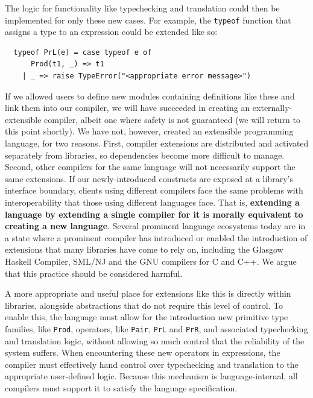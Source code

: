 \documentclass{llncs}
\begin{document}
The logic for functionality like typechecking and translation could then be implemented for only these new cases. For example, the \lstinline{typeof} function that assigns a type to an expression could be extended like so:
\begin{lstlisting}
  typeof PrL(e) = case typeof e of 
      Prod(t1, _) => t1 
    | _ => raise TypeError("<appropriate error message>")
\end{lstlisting}

If we allowed users to define new modules containing definitions like these and link them into our compiler, we will have succeeded in creating an externally-extensible compiler, albeit one where safety is not guaranteed (we will return to this point shortly). We have not, however, created an extensible programming language, for two reasons. First, compiler extensions are distributed and activated separately from libraries, so dependencies become more difficult to manage. Second, other compilers for the same language will not necessarily support the same extensions. 
If our newly-introduced constructs are exposed at a library's  interface boundary, clients using different compilers face the same problems with interoperability that those using different languages face. That is, \textbf{extending a language by extending a single compiler for it is morally equivalent to creating a new language}. Several prominent language ecosystems today are in a state where a prominent compiler has introduced or enabled the introduction of extensions that many libraries have come to rely on, including the Glasgow Haskell Compiler, SML/NJ and the GNU compilers for C and C++. We argue that this practice should be considered harmful.

A more appropriate and useful place for extensions like this is directly within libraries, alongside abstractions that do not require this level of control. To enable this, the language must allow for the introduction new primitive type families, like \lstinline{Prod}, operators, like \lstinline{Pair}, \lstinline{PrL} and \lstinline{PrR}, and associated typechecking and translation logic, without allowing so much control that the reliability of the system suffers. When encountering these new operators in expressions, the compiler must effectively  hand control over typechecking and translation to the appropriate user-defined logic. Because this mechanism is {language-internal}, all compilers must support it to satisfy the language specification.
\end{document}
